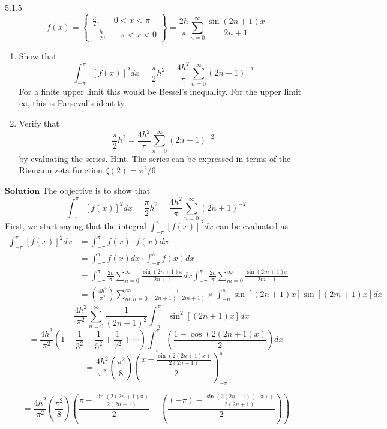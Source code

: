 \documentclass{article}
\begin{document}
\begin{flushleft}
\begin{mybox}{5.1.5}
$$
f(x)=\left\{\begin{array}{lr}
\frac{h}{2}, & 0<x<\pi \\
-\frac{h}{2}, & -\pi<x<0
\end{array}\right\}=\frac{2 h}{\pi} \sum_{n=0}^{\infty} \frac{\sin (2 n+1) x}{2 n+1}
$$
\begin{enumerate}[$a)$]
\item Show that
$$
\int_{-\pi}^{\pi}[f(x)]^{2} d x=\frac{\pi}{2} h^{2}=\frac{4 h^{2}}{\pi} \sum_{n=0}^{\infty}(2 n+1)^{-2}
$$
For a finite upper limit this would be Bessel's inequality. For the upper limit $\infty$, this is Parseval's identity.
\item Verify that
$$
\frac{\pi}{2} h^{2}=\frac{4 h^{2}}{\pi} \sum_{n=0}^{\infty}(2 n+1)^{-2}
$$
by evaluating the series. Hint. The series can be expressed in terms of the Riemann zeta function $\zeta(2)=\pi^{2} / 6$
\end{enumerate}
\end{mybox}




$\boxed{\textbf{Solution}}$ The objective is to show that 
$$
\int_{-\pi}^{\pi}[f(x)]^{2} d x=\frac{\pi}{2} h^{2}=\frac{4 h^{2}}{\pi} \sum_{n=0}^{\infty}(2 n+1)^{-2}
$$
First, we start saying that the integral $\int_{-\pi}^{\pi}[f(x)]^{2} d x$ can be evaluated as
$$
\begin{aligned}
\int_{-\pi}^{\pi}[f(x)]^{2} d x &=\int_{-\pi}^{\pi} f(x) \cdot f(x) d x \\
&=\int_{-\pi}^{\pi} f(x) d x \cdot \int_{-\pi}^{\pi} f(x) d x \\
&=\int_{-\pi}^{\pi} \frac{2 h}{\pi} \sum_{n=0}^{\infty} \frac{\sin (2 n+1) x}{2 n+1} d x \int_{-\pi}^{\pi} \frac{2 h}{\pi} \sum_{m=0}^{\infty} \frac{\sin (2 m+1) x}{2 m+1} \\
&=\left(\frac{4 h^{2}}{\pi^{2}}\right) \sum_{m, n=0}^{\infty} \frac{1}{(2 n+1)(2 m+1)} \times \int_{-n}^{\pi} \sin [(2 n+1) x] \sin [(2 m+1) x] d x
\end{aligned}
$$
$$=\frac{4 h^{2}}{\pi^{2}} \sum_{n=0}^{\infty} \frac{1}{(2 n+1)^{2}} \int_{-\pi}^{\pi} \sin ^{2}[(2 n+1) x] d x$$
$$=\frac{4 h^{2}}{\pi^{2}}\left(1+\frac{1}{3^{2}}+\frac{1}{5^{2}}+\frac{1}{7^{2}}+\cdots\right) \int_{-\pi}^{\pi}\left(\frac{1-\cos (2(2 n+1) x)}{2}\right) d x$$
$$
=\frac{4 h^{2}}{\pi^{2}}\left(\frac{\pi^{2}}{8}\right)\left(\frac{x-\frac{\sin (2(2 n+1) x)}{2(2 n+1)}}{2}\right)_{-\pi}^{\pi}
$$

$$
=\frac{4 h^{2}}{\pi^{2}}\left(\frac{\pi^{2}}{8}\right)\left(\frac{\pi-\frac{\sin (2(2 n+1) \pi)}{2(2 n+1)}}{2}-\left(\frac{(-\pi)-\frac{\sin (2(2 n+1)(-\pi))}{2(2 n+1)}}{2}\right)\right)
$$


\end{flushleft}
\end{document}
